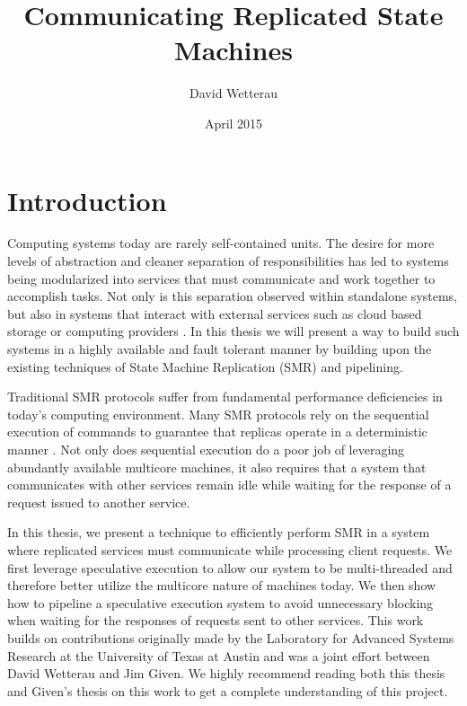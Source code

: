 \documentclass[11pt, oneside]{report}
\title{Communicating Replicated State Machines}
\author{David Wetterau}
\date{April 2015}
\begin{document}
\maketitle

\tableofcontents

\onehalfspacing

\chapter{Introduction}\label{Introduction}
Computing systems today are rarely self-contained units. 
The desire for more levels of abstraction and cleaner separation of responsibilities has led to systems being modularized into services that must communicate and work together to accomplish tasks. 
Not only is this separation observed within standalone systems, but also in systems that interact with external services such as cloud based storage or computing providers \cite{tao, spanner, dynamo}. 
In this thesis we will present a way to build such systems in a highly available and fault tolerant manner by building upon the existing techniques of State Machine Replication (SMR) \cite{practicalBFT, hq, zyz, paxos, paxosMadeSimple, schneider} and pipelining.

Traditional SMR protocols suffer from fundamental performance deficiencies in today's computing environment. 
Many SMR protocols rely on the sequential execution of commands to guarantee that replicas operate in a deterministic manner \cite{practicalBFT, upRight, hq, paxos}. 
Not only does sequential execution do a poor job of leveraging abundantly available multicore machines, it also requires that a system that communicates with other services remain idle while waiting for the response of a request issued to another service.

In this thesis, we present a technique to efficiently perform SMR in a system where replicated services must communicate while processing client requests.
We first leverage speculative execution \cite{eve, zyz} to allow our system to be multi-threaded and therefore better utilize the multicore nature of machines today. 
We then show how to pipeline a speculative execution system to avoid unnecessary blocking when waiting for the responses of requests sent to other services.
This work builds on contributions originally made by the Laboratory for Advanced Systems Research at the University of Texas at Austin \cite{eve, manosThesis} and was a joint effort between David Wetterau and Jim Given. 
We highly recommend reading both this thesis and Given's thesis \cite{jim} on this work to get a complete understanding of this project.
\end{document}
